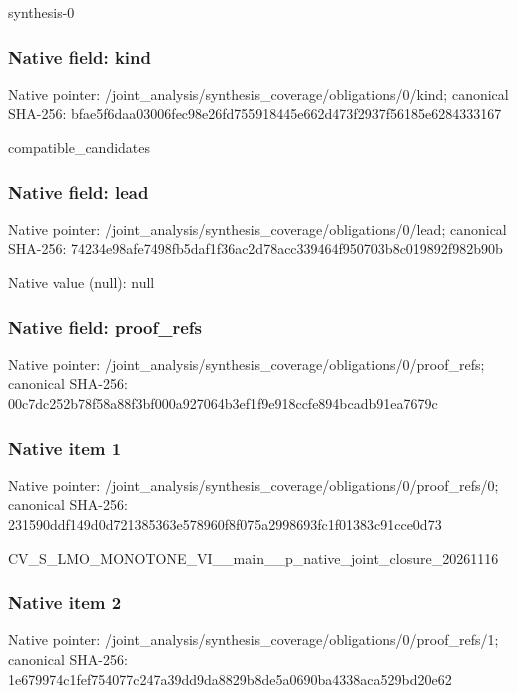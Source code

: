 \documentclass[10pt,a4paper]{article}
\begin{document}
\begingroup\raggedright\sloppy synthesis-0\par\endgroup

\subsubsection{Native field: kind}
Native pointer: /joint\_\allowbreak{}analysis/synthesis\_\allowbreak{}coverage/obligations/0/kind; canonical SHA-256: bfae5f6daa03006fec98e26fd755918445e662d473f2937f56185e6284333167

\begingroup\raggedright\sloppy compatible\_\allowbreak{}candidates\par\endgroup

\subsubsection{Native field: lead}
Native pointer: /joint\_\allowbreak{}analysis/synthesis\_\allowbreak{}coverage/obligations/0/lead; canonical SHA-256: 74234e98afe7498fb5daf1f36ac2d78acc339464f950703b8c019892f982b90b

Native value (null): null

\subsubsection{Native field: proof\_\allowbreak{}refs}
Native pointer: /joint\_\allowbreak{}analysis/synthesis\_\allowbreak{}coverage/obligations/0/proof\_\allowbreak{}refs; canonical SHA-256: 00c7dc252b78f58a88f3bf000a927064b3ef1f9e918ccfe894bcadb91ea7679c

\subsubsection{Native item 1}
Native pointer: /joint\_\allowbreak{}analysis/synthesis\_\allowbreak{}coverage/obligations/0/proof\_\allowbreak{}refs/0; canonical SHA-256: 231590ddf149d0d721385363e578960f8f075a2998693fc1f01383c91cce0d73

\begingroup\raggedright\sloppy CV\_\allowbreak{}S\_\allowbreak{}LMO\_\allowbreak{}MONOTONE\_\allowbreak{}VI\_\allowbreak{}\_\allowbreak{}main\_\allowbreak{}\_\allowbreak{}p\_\allowbreak{}native\_\allowbreak{}joint\_\allowbreak{}closure\_\allowbreak{}20261116\par\endgroup

\subsubsection{Native item 2}
Native pointer: /joint\_\allowbreak{}analysis/synthesis\_\allowbreak{}coverage/obligations/0/proof\_\allowbreak{}refs/1; canonical SHA-256: 1e679974c1fef754077c247a39dd9da8829b8de5a0690ba4338aca529bd20e62
\end{document}
